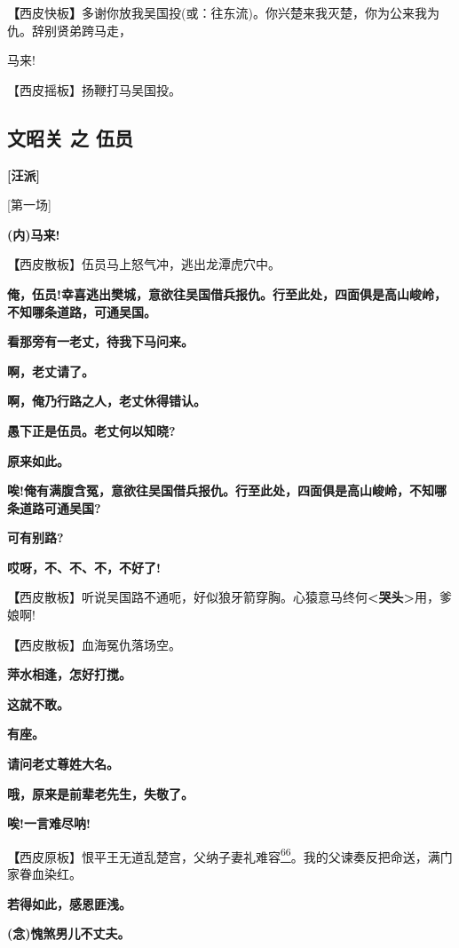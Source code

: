 \textbf{【}西皮快板\textbf{】}多谢你放我吴国投(或：往东流)。你兴楚来我灭楚，你为公来我为仇。辞别贤弟跨马走，

马来!

【西皮摇板】扬鞭打马吴国投。

\newpage
\hypertarget{ux6587ux662dux5173-ux4e4b-ux4f0dux5458}{%
\subsection{文昭关 之
伍员}\label{ux6587ux662dux5173-ux4e4b-ux4f0dux5458}}

\textbf{{[}汪派{]}}

{[}第一场{]}

\textbf{(内)马来!}

\textbf{【}西皮散板】伍员马上怒气冲，逃出龙潭虎穴中。

\textbf{俺，伍员!幸喜逃出樊城，意欲往吴国借兵报仇。行至此处，四面俱是高山峻岭，不知哪条道路，可通吴国。}

\textbf{看那旁有一老丈，待我下马问来。}

\textbf{啊，老丈请了。}

\textbf{啊，俺乃行路之人，老丈休得错认。}

\textbf{愚下正是伍员。老丈何以知晓?}

\textbf{原来如此。}

\textbf{唉!俺有满腹含冤，意欲往吴国借兵报仇。行至此处，四面俱是高山峻岭，不知哪条道路可通吴国?}

\textbf{可有别路?}

\textbf{哎呀，不、不、不，不好了!}

\textbf{【}西皮散板】听说吴国路不通呃，好似狼牙箭穿胸。心猿意马终何\textbf{\textless{}哭头\textgreater{}}用，爹娘啊!

\textbf{【}西皮散板】血海冤仇落场空。

\textbf{萍水相逢，怎好打搅。}

\textbf{这就不敢。}

\textbf{有座。}

\textbf{请问老丈尊姓大名。}

\textbf{哦，原来是前辈老先生，失敬了。}

\textbf{唉!一言难尽呐!}

\textbf{【}西皮原板】恨平王无道乱楚宫，父纳子妻礼难容\protect\hyperlink{fn66}{\textsuperscript{66}}。我的父谏奏反把命送，满门家眷血染红。

\textbf{若得如此，感恩匪浅。}

\textbf{(念)愧煞男儿不丈夫。}

